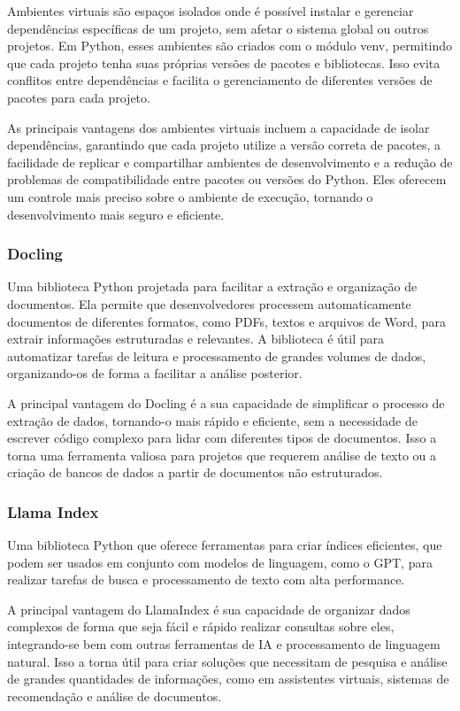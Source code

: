 \documentclass[a4paper, 12pt]{article}
\begin{document}
    Ambientes virtuais são espaços isolados onde é possível instalar e gerenciar dependências específicas de um projeto, sem afetar o sistema global ou outros projetos. Em Python, esses ambientes são criados com o módulo venv, permitindo que cada projeto tenha suas próprias versões de pacotes e bibliotecas. Isso evita conflitos entre dependências e facilita o gerenciamento de diferentes versões de pacotes para cada projeto.

    As principais vantagens dos ambientes virtuais incluem a capacidade de isolar dependências, garantindo que cada projeto utilize a versão correta de pacotes, a facilidade de replicar e compartilhar ambientes de desenvolvimento e a redução de problemas de compatibilidade entre pacotes ou versões do Python. Eles oferecem um controle mais preciso sobre o ambiente de execução, tornando o desenvolvimento mais seguro e eficiente.

    \subsubsection{Docling}
    Uma biblioteca Python projetada para facilitar a extração e organização de documentos. Ela permite que desenvolvedores processem automaticamente documentos de diferentes formatos, como PDFs, textos e arquivos de Word, para extrair informações estruturadas e relevantes. A biblioteca é útil para automatizar tarefas de leitura e processamento de grandes volumes de dados, organizando-os de forma a facilitar a análise posterior.

    A principal vantagem do Docling é a sua capacidade de simplificar o processo de extração de dados, tornando-o mais rápido e eficiente, sem a necessidade de escrever código complexo para lidar com diferentes tipos de documentos. Isso a torna uma ferramenta valiosa para projetos que requerem análise de texto ou a criação de bancos de dados a partir de documentos não estruturados.

    \subsubsection{Llama Index}
    Uma biblioteca Python que oferece ferramentas para criar índices eficientes, que podem ser usados em conjunto com modelos de linguagem, como o GPT, para realizar tarefas de busca e processamento de texto com alta performance.

    A principal vantagem do LlamaIndex é sua capacidade de organizar dados complexos de forma que seja fácil e rápido realizar consultas sobre eles, integrando-se bem com outras ferramentas de IA e processamento de linguagem natural. Isso a torna útil para criar soluções que necessitam de pesquisa e análise de grandes quantidades de informações, como em assistentes virtuais, sistemas de recomendação e análise de documentos.
\end{document}
